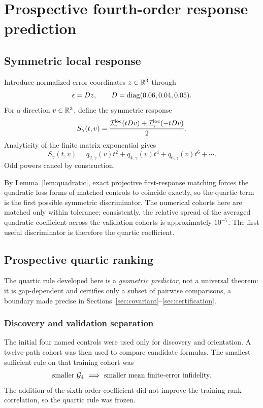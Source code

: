 \section{Prospective fourth-order response prediction}\label{sec:quartic}

\subsection{Symmetric local response}

Introduce normalized error coordinates $z\in\mathbb{R}^{3}$ through
\[
\epsilon=Dz,\qquad D=\operatorname{diag}(0.06,0.04,0.05).
\]
For a direction $v\in\mathbb{R}^{3}$, define the symmetric response
\begin{equation}\label{eq:symmetric}
S_{\gamma}(t,v)=\frac{\mathcal{I}^{\mathrm{loc}}_{\gamma}(tDv)+\mathcal{I}^{\mathrm{loc}}_{\gamma}(-tDv)}{2}.
\end{equation}
Analyticity of the finite matrix exponential gives
\begin{equation}\label{eq:taylor}
S_{\gamma}(t,v)=q_{2,\gamma}(v)t^{2}+q_{4,\gamma}(v)t^{4}+q_{6,\gamma}(v)t^{6}+\cdots.
\end{equation}
Odd powers cancel by construction.

By Lemma~\ref{lem:quadratic}, exact projective first-response matching forces the quadratic
loss forms of matched controls to coincide exactly, so the quartic term is the first
possible symmetric discriminator. The numerical cohorts here are matched only within
tolerance; consistently, the relative spread of the averaged quadratic coefficient across
the validation cohorts is approximately $10^{-7}$. The first useful discriminator is
therefore the quartic coefficient.

\subsection{Prospective quartic ranking}

The quartic rule developed here is a \emph{geometric predictor}, not a universal theorem:
it is gap-dependent and certifies only a subset of pairwise comparisons, a boundary made
precise in Sections~\ref{sec:covariant}--\ref{sec:certification}.

\subsubsection{Discovery and validation separation}

The initial four named controls were used only for discovery and orientation. A twelve-path
cohort was then used to compare candidate formulas. The smallest sufficient rule on that
training cohort was
\[
\text{smaller }\Gg_{4}\ \Longrightarrow\ \text{smaller mean finite-error infidelity.}
\]
The addition of the sixth-order coefficient did not improve the training rank correlation,
so the quartic rule was frozen.

